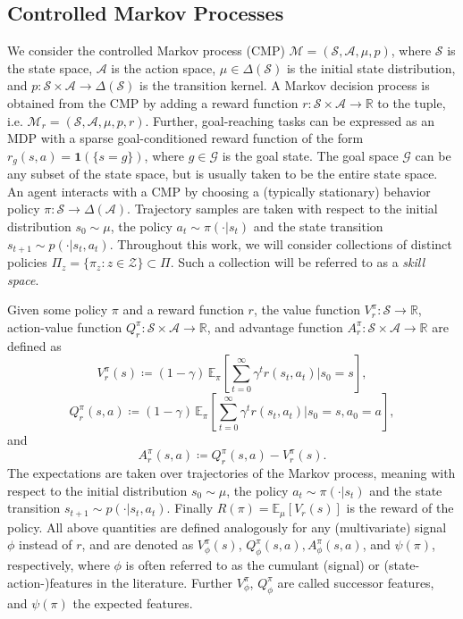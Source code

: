 \documentclass{article}
\theoremstyle{plain}
\theoremstyle{definition}
\theoremstyle{remark}
\newcommand{\sS}{\mathcal{S}}
\newcommand{\sA}{\mathcal{A}}
\newcommand{\sR}{\mathbb{R}}
\newcommand{\dist}[1]{\Delta({#1})}
\begin{document}
\subsection{Controlled Markov Processes}
We consider the controlled Markov process (CMP) $\mathcal{M} = (\sS, \sA, \mu, p)$, where $\sS$ is the state space, $\sA$ is the action space, $\mu\in \dist\sS$ is the initial state distribution, and $p: \sS\times\sA \to \dist\sS$ is the transition kernel. 
A Markov decision process is obtained from the CMP by adding a reward function $r:\sS\times\sA \to \sR$ to the tuple, i.e. $\mathcal{M}_r = (\sS, \sA, \mu, p, r)$. 
Further, goal-reaching tasks can be expressed as an MDP with a sparse goal-conditioned reward function of the form $r_g(s,a) = \mathbf{1}(\{s=g\})$, where $g\in\mathcal{G}$ is the goal state. 
The goal space $\mathcal{G}$ can be any subset of the state space, but is usually taken to be the entire state space.
An agent interacts with a CMP by choosing a (typically stationary) behavior policy $\pi:\sS\to\dist\sA$. 
Trajectory samples are taken with respect to the initial distribution $s_0\sim\mu$, the policy $a_{t}\sim\pi(\cdot|s_t)$ and the state transition $s_{t+1} \sim p(\cdot|s_t, a_t)$. 
Throughout this work, we will consider collections of distinct policies $\Pi_z = \{\pi_z: z\in \mathcal{Z}\}\subset\Pi$. 
Such a collection will be referred to as a \emph{skill space}.

Given some policy $\pi$ and a reward function $r$, the value function $V_r^\pi\colon \sS \to \mathbb{R}$, action-value function $Q_r^\pi\colon \sS\times\sA \to \mathbb{R}$, and advantage function $A_r^\pi\colon \sS \times \sA \to \mathbb{R}$ are defined as
\begin{equation*}
    V_r^\pi(s) \coloneqq (1-\gamma)\,\mathbb{E}_\pi \left[ \sum_{t=0}^{\infty} \gamma^t r(s_t, a_t) \Big|  s_0 = s \right],    
\end{equation*}
\begin{equation*}
    Q_r^\pi(s, a) \coloneqq (1-\gamma)\,\mathbb{E}_\pi \left[ \sum_{t=0}^{\infty} \gamma^t r(s_t, a_t) \Big| s_0 = s, a_0 = a \right],
\end{equation*}
and
\begin{equation*}
A_r^\pi(s,a) \coloneqq Q_r^\pi(s, a) - V_r^\pi(s).
\end{equation*}
The expectations are taken over trajectories of the Markov process, meaning with respect to the initial distribution $s_0\sim\mu$, the policy $a_{t}\sim\pi(\cdot|s_t)$ and the state transition $s_{t+1} \sim p(\cdot|s_t, a_t)$. Finally $R(\pi) = \mathbb{E}_\mu[V_r(s)]$ is the reward of the policy. All above quantities are defined analogously for any (multivariate) signal $\phi$ instead of $r$, and are denoted as $V_{\phi}^\pi(s)$, $Q_{\phi}^\pi(s,a), A_{\phi}^\pi(s,a)$, and $\psi(\pi)$, respectively, where $\phi$ is often referred to as the cumulant (signal) or (state-action-)features in the literature. Further $V_{\phi}^\pi$, $Q_{\phi}^\pi$ are called successor features, and $\psi(\pi)$ the expected features.
\end{document}

